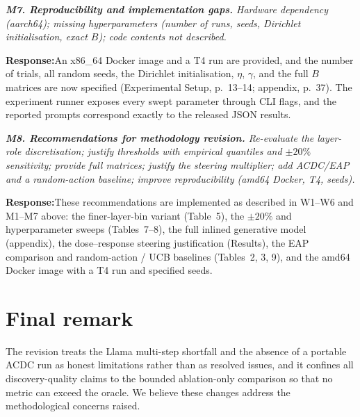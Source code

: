 \documentclass[11pt]{article}
\newenvironment{comment}{%
  \def\FrameCommand{{\color{commentrule}\vrule width 3pt}\hspace{0pt}%
    \fboxsep=8pt\colorbox{commentbg}}%
  \MakeFramed{\advance\hsize-\width\FrameRestore}%
  \itshape\small}{\endMakeFramed}
\newcommand{\response}{\par\smallskip\noindent\textbf{Response:}\;}
\begin{document}
\begin{comment}
\textbf{M7. Reproducibility and implementation gaps.} Hardware dependency
(aarch64); missing hyperparameters (number of runs, seeds, Dirichlet
initialisation, exact $B$); code contents not described.
\end{comment}
\response An x86\_64 Docker image and a T4 run are provided, and the number of
trials, all random seeds, the Dirichlet initialisation, $\eta$, $\gamma$, and the
full $B$ matrices are now specified (Experimental Setup, p.~13--14; appendix,
p.~37). The experiment runner exposes every swept parameter through CLI flags,
and the reported prompts correspond exactly to the released JSON results.

\begin{comment}
\textbf{M8. Recommendations for methodology revision.} Re-evaluate the layer-role
discretisation; justify thresholds with empirical quantiles and $\pm20\%$
sensitivity; provide full matrices; justify the steering multiplier; add ACDC/EAP
and a random-action baseline; improve reproducibility (amd64 Docker, T4, seeds).
\end{comment}
\response These recommendations are implemented as described in W1--W6 and M1--M7
above: the finer-layer-bin variant (Table~5), the $\pm20\%$ and hyperparameter
sweeps (Tables~7--8), the full inlined generative model (appendix), the
dose--response steering justification (Results), the EAP comparison and
random-action / UCB baselines (Tables~2, 3, 9), and the amd64 Docker image with a
T4 run and specified seeds.

\section*{Final remark}
The revision treats the Llama multi-step shortfall and the absence of a portable
ACDC run as honest limitations rather than as resolved issues, and it confines all
discovery-quality claims to the bounded ablation-only comparison so that no metric
can exceed the oracle. We believe these changes address the methodological
concerns raised.
\end{document}
